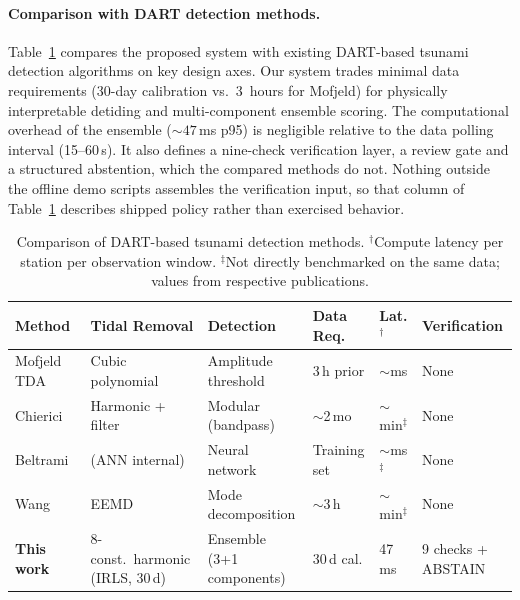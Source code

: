 \documentclass{article}
\begin{document}
\paragraph{Comparison with DART detection methods.}
Table~\ref{tab:method-comparison} compares the proposed system with
existing DART-based tsunami detection algorithms on key design axes.
Our system trades minimal data requirements (30-day calibration vs.\
3~hours for Mofjeld) for physically interpretable detiding and
multi-component ensemble scoring. The computational overhead of the
ensemble (${\sim}47$\,ms p95) is negligible relative to the data
polling interval (15--60\,s). It also defines a nine-check
verification layer, a review gate and a structured abstention, which
the compared methods do not. Nothing outside the offline demo scripts
assembles the verification input, so that column of
Table~\ref{tab:method-comparison} describes shipped policy rather
than exercised behavior.

\begin{table}[!htb]
\centering
\caption{Comparison of DART-based tsunami detection methods.
  $^\dagger$Compute latency per station per observation window.
  $^\ddagger$Not directly benchmarked on the same data; values from
  respective publications.}
\label{tab:method-comparison}
\footnotesize
\setlength{\tabcolsep}{3pt}
\begin{tabular}{p{2.4cm}p{2.4cm}p{2.2cm}p{1.4cm}p{1.1cm}p{2.3cm}}
\toprule
\textbf{Method} & \textbf{Tidal Removal} & \textbf{Detection} & \textbf{Data Req.} & \textbf{Lat.$^\dagger$} & \textbf{Verification} \\
\midrule
Mofjeld TDA~\citep{mofjeld1997tsunami}
  & Cubic polynomial & Amplitude threshold & 3\,h prior & $\sim$ms & None \\[3pt]
Chierici~\citep{chierici2017new}
  & Harmonic + filter & Modular (bandpass) & $\sim$2\,mo & $\sim$min$^\ddagger$ & None \\[3pt]
Beltrami~\citep{beltrami2008ann}
  & (ANN internal) & Neural network & Training set & $\sim$ms$^\ddagger$ & None \\[3pt]
Wang~\citep{wang2020realtime}
  & EEMD & Mode decomposition & $\sim$3\,h & $\sim$min$^\ddagger$ & None \\[3pt]
\textbf{This work}
  & 8-const.\ harmonic (IRLS, 30\,d) & Ensemble (3{+}1 components) & 30\,d cal. & 47\,ms & 9 checks + ABSTAIN \\
\bottomrule
\end{tabular}
\end{table}
\end{document}
